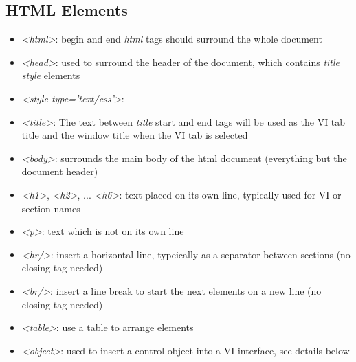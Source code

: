 \documentclass[letterpaper,10pt,english]{sphinxmanual}
\begin{document}
\subsection{HTML Elements}
\label{programming:html-elements}\begin{itemize}
\item {} 
\emph{\textless{}html\textgreater{}}: begin and end \emph{html} tags should surround the whole document

\item {} 
\emph{\textless{}head\textgreater{}}: used to surround the header of the document, which contains \emph{title}
\emph{style} elements

\item {} 
\emph{\textless{}style type='text/css'\textgreater{}}:

\item {} 
\emph{\textless{}title\textgreater{}}: The text between \emph{title} start and end tags will be used as the
VI tab title and the window title when the VI tab is selected

\item {} 
\emph{\textless{}body\textgreater{}}: surrounds the main body of the html document (everything but the
document header)

\item {} 
\emph{\textless{}h1\textgreater{}}, \emph{\textless{}h2\textgreater{}}, ... \emph{\textless{}h6\textgreater{}}: text placed on its own line, typically used for
VI or section names

\item {} 
\emph{\textless{}p\textgreater{}}: text which is not on its own line

\item {} 
\emph{\textless{}hr/\textgreater{}}: insert a horizontal line, typeically as a separator between sections
(no closing tag needed)

\item {} 
\emph{\textless{}br/\textgreater{}}: insert a line break to start the next elements on a new line (no
closing tag needed)

\item {} 
\emph{\textless{}table\textgreater{}}: use a table to arrange elements

\item {} 
\emph{\textless{}object\textgreater{}}: used to insert a control object into a VI interface, see details
below

\end{itemize}
\end{document}
